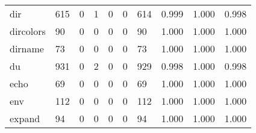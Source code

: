 \begin{longtable}{lp{1.3cm}p{1.3cm}p{1.3cm}p{1.3cm}p{1.3cm}p{1.3cm}p{1.3cm}p{1.3cm}p{1.3cm}}
dir       &                    615 &                                             0 &                                            1 &                                           0 &                                            0 &                                        614 &                                0.999 &                                  1.000 &                                0.998 \\
dircolors &                     90 &                                             0 &                                            0 &                                           0 &                                            0 &                                         90 &                                1.000 &                                  1.000 &                                1.000 \\
dirname   &                     73 &                                             0 &                                            0 &                                           0 &                                            0 &                                         73 &                                1.000 &                                  1.000 &                                1.000 \\
du        &                    931 &                                             0 &                                            2 &                                           0 &                                            0 &                                        929 &                                0.998 &                                  1.000 &                                0.998 \\
echo      &                     69 &                                             0 &                                            0 &                                           0 &                                            0 &                                         69 &                                1.000 &                                  1.000 &                                1.000 \\
env       &                    112 &                                             0 &                                            0 &                                           0 &                                            0 &                                        112 &                                1.000 &                                  1.000 &                                1.000 \\
expand    &                     94 &                                             0 &                                            0 &                                           0 &                                            0 &                                         94 &                                1.000 &                                  1.000 &                                1.000 \\

\end{longtable}
